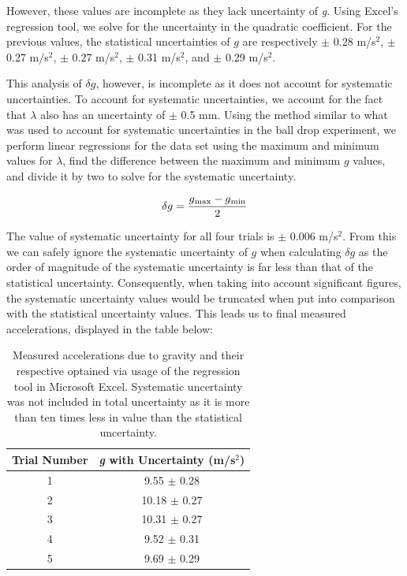 \documentclass[titlepage]{article}
\begin{document}
However, these values are incomplete as they lack uncertainty of \textit{g}. Using Excel's regression tool, we solve for the uncertainty in the quadratic coefficient. For the previous values, the statistical uncertainties of $g$ are respectively $\pm$ 0.28 m/s$^2$, $\pm$ 0.27 m/s$^2$, $\pm$ 0.27 m/s$^2$, $\pm$ 0.31 m/s$^2$, and $\pm$ 0.29 m/s$^2$. 

This analysis of $\delta g$, however, is incomplete as it does not account for systematic uncertainties. To account for systematic uncertainties, we account for the fact that $\lambda$ also has an uncertainty of $\pm$ 0.5 mm. Using the method similar to what was used to account for systematic uncertainties in the ball drop experiment, we perform linear regressions for the data set using the maximum and minimum values for $\lambda$, find the difference between the maximum and minimum $g$ values, and divide it by two to solve for the systematic uncertainty.

\begin{align}
    \delta g = \frac{g\textsubscript{max} - g\textsubscript{min}}{2}
\end{align}

The value of systematic uncertainty for all four trials is  $\pm$ 0.006 m/s$^2$. From this we can safely ignore the systematic uncertainty of $g$ when calculating $\delta g$ as the order of magnitude of the systematic uncertainty is far less than that of the statistical uncertainty. Consequently, when taking into account significant figures, the systematic uncertainty values would be truncated when put into comparison with the statistical uncertainty values. This leads us to final measured accelerations, displayed in the table below:

\begin{table}[!htbp]
\renewcommand{\arraystretch}{1.3}
\centering
\begin{tabular}{c|c}
    \hline
    \hline
    Trial Number & \textit{g} with Uncertainty (m/s$^2$)\\
    \hline
    \hline

    1    &  9.55 $\pm$ 0.28 \\
    \hline

    2    &  10.18 $\pm$ 0.27 \\
    \hline

    3   &   10.31 $\pm$ 0.27\\
    \hline

    4   &  9.52 $\pm$ 0.31\\
    \hline

    5  &  9.69 $\pm$ 0.29\\
    \hline
\end{tabular}
\caption{Measured accelerations due to gravity and their respective optained via usage of the regression tool in Microsoft Excel. Systematic uncertainty was not included in total uncertainty as it is more than ten times less in value than the statistical uncertainty. }
\end{table}
\end{document}
